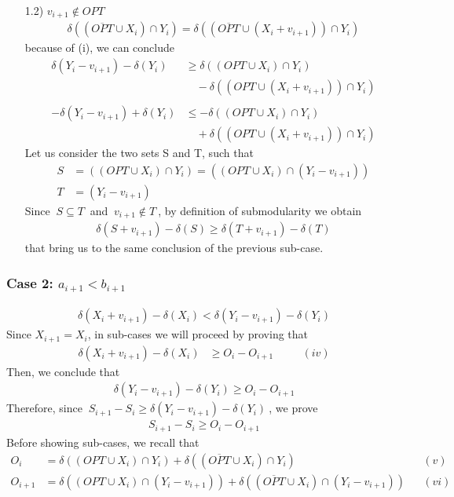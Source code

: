 \documentclass[a4paper,11pt]{article}
\begin{document}
\begin{itemize}
	\newpage
	\item[1.2)] $ v_{i+1} \not  \in OPT$
	\begin{align*}
	\delta((\overline{OPT} \cup X_i) \cap Y_i) = \delta((\overline{OPT} \cup (X_{i} + v_{i+1})) \cap Y_{i})
	\end{align*}
	because of (i), we can conclude
	\begin{align*}
	\delta(Y_{i} - v_{i+1})  - \delta(Y_{i}) &\geq  \delta((OPT \cup X_i) \cap Y_i)\\ &\quad - \delta((OPT \cup (X_{i} + v_{i+1})) \cap Y_{i})\\\\
	-\delta(Y_{i} - v_{i+1})  + \delta(Y_{i})  &\leq  - \delta((OPT \cup X_i) \cap Y_i)\\ &\quad + \delta((OPT \cup (X_{i} + v_{i+1})) \cap Y_{i})
	\end{align*}
	Let us consider the two sets S and T, such that
	\begin{align*}
	S &= ((OPT \cup X_i) \cap Y_i) = ((OPT \cup X_i) \cap (Y_i - v_{i+1}))\\
	T &= (Y_i - v_{i+1})
	\end{align*}
	Since $\ S \subseteq T \ $ and $\ v_{i+1} \not \in T \ $, by definition of submodularity we obtain
	\begin{align*}
	\delta(S + v_{i+1}) - \delta(S)  \geq  \delta(T + v_{i+1}) - \delta(T)
	\end{align*}
	that bring us to the same conclusion of the previous sub-case.
	
\end{itemize}

\subsubsection{Case 2: $ a_{i+1} < b_{i+1}$}
\begin{align*}
\delta(X_{i} + v_{i+1}) - \delta(X_{i})  < \delta(Y_{i} - v_{i+1})  - \delta(Y_{i})
\end{align*}
Since $X_{i+1} = X_i$, in sub-cases we will proceed by proving that
\begin{align*}
\delta(X_{i} + v_{i+1})  - \delta(X_{i}) &\geq  O_i - O_{i+1} & &\quad (iv)
\end{align*}
Then, we conclude that 
\begin{align*}
\delta(Y_{i} - v_{i+1}) - \delta(Y_{i})  \geq O_i - O_{i+1}
\end{align*}
Therefore, since $\ S_{i+1} - S_i \geq \delta(Y_{i} - v_{i+1}) - \delta(Y_{i}) \ $, we prove
\begin{align*}
S_{i+1} - S_i  \geq O_i - O_{i+1}
\end{align*}
Before showing sub-cases, we recall that
\begin{align*}
O_i &= \delta((OPT \cup X_i) \cap Y_i) + \delta((\overline{OPT} \cup X_i) \cap Y_i)& &(v)\\
O_{i+1} &= \delta((OPT \cup X_{i}) \cap (Y_{i} - v_{i+1})) + \delta((\overline{OPT} \cup X_{i}) \cap (Y_{i} - v_{i+1}))& &(vi)\\
\end{align*}
\end{document}
